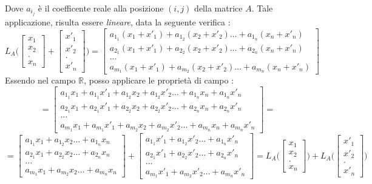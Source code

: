 \documentclass[12pt, letterpaper]{article}
\newcommand{\R}{{\mathbb R}}
\begin{document}
Dove \(a_{i_j}\) è il coefficente reale alla posizione \((i,j)\) della matrice \(A\).  Tale applicazione, risulta 
essere \textit{lineare}, data la seguente verifica : \begin{equation}
    L_A\Bigg(\begin{bmatrix}
        x_1\\x_2\\.\\x_n
    \end{bmatrix}+\begin{bmatrix}
        x'_1\\x'_2\\.\\x'_n
    \end{bmatrix}\Bigg) = 
    \begin{bmatrix}
        a_{1_1}(x_1+x'_1)+a_{1_2}(x_2+x'_2)\dots+a_{1_n}(x_n+x'_n)\\
        a_{2_1}(x_1+x'_1)+a_{2_2}(x_2+x'_2)\dots+a_{2_n}(x_n+x'_n)\\\dots \\
        a_{m_1}(x_1+x'_1)+a_{m_2}(x_2+x'_2)\dots+a_{m_n}(x_n+x'_n)
    \end{bmatrix} 
\end{equation}
Essendo nel campo \(\R\), posso applicare le proprietà di campo : \begin{equation}
    =\begin{bmatrix}
        a_{1_1}x_1+a_{1_1}x'_1+a_{1_2}x_2+a_{1_2}x'_2\dots+a_{1_n}x_n+a_{1_n}x'_n\\
        a_{2_1}x_1+a_{2_1}x'_1+a_{2_2}x_2+a_{2_2}x'_2\dots+a_{2_n}x_n+a_{2_n}x'_n\\\dots \\
        a_{m_1}x_1+a_{m_1}x'_1+a_{m_2}x_2+a_{m_2}x'_2\dots+a_{m_n}x_n+a_{m_n}x'_n
    \end{bmatrix}=\end{equation}\begin{equation}=\begin{bmatrix}
        a_{1_1}x_1+a_{1_2}x_2\dots+a_{1_n}x_n\\
        a_{2_1}x_1+a_{2_2}x_2\dots+a_{2_n}x_n\\\dots \\
        a_{m_1}x_1+a_{m_2}x_2\dots+a_{m_n}x_n
    \end{bmatrix}+\begin{bmatrix}
        a_{1_1}x'_1+a_{1_2}x'_2\dots+a_{1_n}x'_n\\
        a_{2_1}x'_1+a_{2_2}x'_2\dots+a_{2_n}x'_n\\\dots \\
        a_{m_1}x'_1+a_{m_2}x'_2\dots+a_{m_n}x'_n
    \end{bmatrix}=L_A\Bigg(\begin{bmatrix}
        x_1\\x_2\\.\\x_n
    \end{bmatrix}\Bigg)+L_A\Bigg(\begin{bmatrix}
        x'_1\\x'_2\\.\\x'_n
    \end{bmatrix}\Bigg)
\end{equation}
\end{document}
